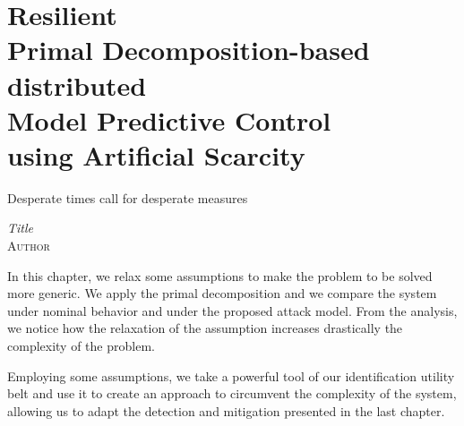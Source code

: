 \documentclass[../main.tex]{subfiles}
\begin{document}
\chapter[Resilient Primal Decomposition-based dMPC using Artificial Scarcity]{Resilient \\Primal Decomposition-based \\distributed \\Model Predictive Control\\using Artificial Scarcity}\label{sec:safe_pddmpc_ineq}
\epigraph{\centering Desperate times call for desperate measures}
{\textit{Title}\\\textsc{Author}}

In this chapter, we relax some assumptions to make the problem to be solved more generic.
We apply the primal decomposition and we compare the system under nominal behavior and under the proposed attack model.
From the analysis, we notice how the relaxation of the assumption increases drastically the complexity of the problem.

Employing some assumptions, we take a powerful tool of our identification utility belt and use it to create an approach to circumvent the complexity of the system, allowing us to adapt the detection and mitigation presented in the last chapter.

\minitoc
\end{document}
